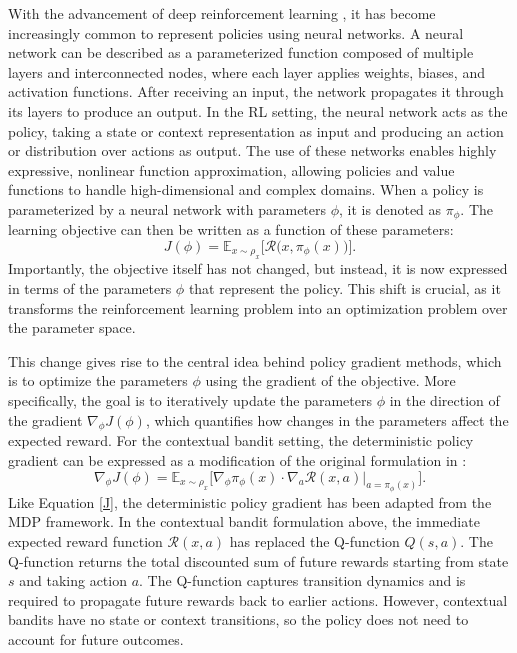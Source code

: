 \documentclass[./dissertation.tex]{subfiles}
\begin{document}
With the advancement of deep reinforcement learning \parencite{DeepRL}, it has become increasingly common to represent policies using neural networks. A neural network \parencite{NN} can be described as a parameterized function composed of multiple layers and interconnected nodes, where each layer applies weights, biases, and activation functions. After receiving an input, the network propagates it through its layers to produce an output. In the RL setting, the neural network acts as the policy, taking a state or context representation as input and producing an action or distribution over actions as output. The use of these networks enables highly expressive, nonlinear function approximation, allowing policies and value functions to handle high-dimensional and complex domains. When a policy is parameterized by a neural network with parameters $\phi$, it is denoted as $\pi_\phi$. The learning objective can then be written as a function of these parameters:
\begin{equation}
J(\phi) = \mathbb{E}_{x \sim \rho_x}\Big[\mathcal{R}\big(x,\pi_\phi(x) \big)\Big].
\end{equation}
Importantly, the objective itself has not changed, but instead, it is now expressed in terms of the parameters $\phi$ that represent the policy. This shift is crucial, as it transforms the reinforcement learning problem into an optimization problem over the parameter space.

This change gives rise to the central idea behind policy gradient methods, which is to optimize the parameters $\phi$ using the gradient of the objective. More specifically, the goal is to iteratively update the parameters $\phi$ in the direction of the gradient $\nabla_\phi J(\phi)$, which quantifies how changes in the parameters affect the expected reward. For the contextual bandit setting, the deterministic policy gradient can be expressed as a modification of the original formulation in \cite{DPG}:
\begin{equation}
\nabla_\phi J(\phi) =
\mathbb{E}_{x \sim \rho_x}
\Big[\nabla_\phi \pi_\phi(x) \cdot \nabla_a \mathcal{R}(x,a) \big|_{a=\pi_\phi(x)} \Big].
\label{GJ}
\end{equation}
Like Equation \ref{J}, the deterministic policy gradient has been adapted from the MDP framework. In the contextual bandit formulation above, the immediate expected reward function $\mathcal{R}(x,a)$ has replaced the Q-function $Q(s,a)$. The Q-function returns the total discounted sum of future rewards starting from state $s$ and taking action $a$. The Q-function captures transition dynamics and is required to propagate future rewards back to earlier actions. However, contextual bandits have no state or context transitions, so the policy does not need to account for future outcomes.
\end{document}
